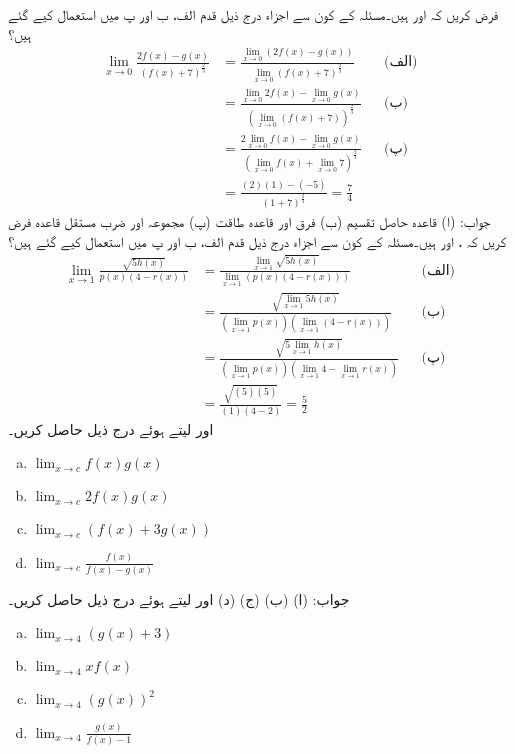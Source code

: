 فرض کریں کہ  اور  ہیں۔مسئلہ  کے کون سے اجزاء درج ذیل قدم الف، ب اور پ میں استعمال کیے گئے ہیں؟
\begin{align*}
\lim_{x\to 0}\frac{2f(x)-g(x)}{(f(x)+7)^{\tfrac{2}{3}}}&=\frac{\lim_{x\to 0}(2f(x)-g(x))}{\lim_{x\to 0}(f(x)+7)^{\tfrac{2}{3}}}&& \text{(الف)}\\
&=\frac{\lim_{x\to 0} 2f(x)-\lim_{x\to 0} g(x)}{(\lim_{x\to 0} (f(x)+7))^{\tfrac{2}{3}}}&&\text{(ب)}\\
&=\frac{2\lim_{x\to 0} f(x)-\lim_{x\to 0} g(x)}{(\lim_{x\to 0} f(x)+\lim_{x\to 0} 7)^{\tfrac{2}{3}}}&&\text{(پ)}\\
&=\frac{(2)(1)-(-5)}{(1+7)^{\tfrac{2}{3}}}=\frac{7}{4}
\end{align*}
جواب: (ا) قاعدہ حاصل تقسیم (ب) فرق اور قاعدہ طاقت (پ) مجموعہ اور ضرب مستقل قاعدہ
فرض کریں کہ ،  اور  ہیں۔مسئلہ  کے کون سے اجزاء درج ذیل قدم الف، ب اور پ میں استعمال کیے گئے ہیں؟
\begin{align*}
\lim_{x\to 1}\frac{\sqrt{5h(x)}}{p(x)(4-r(x))}&=\frac{\lim_{x\to 1} \sqrt{5h(x)}}{\lim_{x\to 1}(p(x)(4-r(x)))}&&\text{(الف)}\\
&=\frac{\sqrt{\lim_{x\to 1} 5h(x)}}{(\lim_{x\to 1} p(x))(\lim_{x\to 1}(4-r(x)))}&&\text{(ب)}\\
&=\frac{\sqrt{5\lim_{x\to 1}h(x)}}{(\lim_{x\to 1} p(x))(\lim_{x\to 1}4-\lim_{x\to 1} r(x))}&&\text{(پ)}\\
&=\frac{\sqrt{(5)(5)}}{(1)(4-2)}=\frac{5}{2}
\end{align*}
 اور  لیتے ہوئے درج ذیل حاصل کریں۔
\begin{multicols}{2}
\begin{enumerate}[a.]
\item
$\lim_{x\to c} f(x)g(x)$
\item
$\lim_{x\to c} 2f(x)g(x)$
\item
$\lim_{x\to c} (f(x)+3g(x))$
\item
$\lim_{x\to c}\tfrac{f(x)}{f(x)-g(x)}$
\end{enumerate}
\end{multicols}
جواب: (ا)  (ب)  (ج)  (د) 
 اور  لیتے ہوئے درج ذیل حاصل کریں۔
\begin{multicols}{2}
\begin{enumerate}[a.]
\item
$\lim_{x\to 4} (g(x)+3)$
\item
$\lim_{x\to 4} xf(x)$
\item
$\lim_{x\to 4} (g(x))^2$
\item
$\lim_{x\to 4} \tfrac{g(x)}{f(x)-1}$
\end{enumerate}
\end{multicols}

